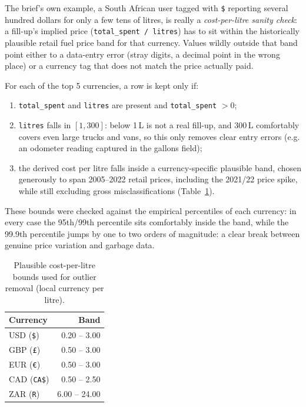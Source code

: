 \documentclass{article}
\begin{document}
The brief's own example, a South African user tagged with \texttt{\$} reporting
several hundred dollars for only a few tens of litres, is really a \emph{cost-per-litre
sanity check}: a fill-up's implied price (\texttt{total\_spent / litres}) has to sit
within the historically plausible retail fuel price band for that currency. Values
wildly outside that band point either to a data-entry error (stray digits, a decimal
point in the wrong place) or a currency tag that does not match the price actually paid.

For each of the top 5 currencies, a row is kept only if:
\begin{enumerate}
  \item \texttt{total\_spent} and \texttt{litres} are present and \texttt{total\_spent} $> 0$;
  \item \texttt{litres} falls in $[1, 300]$: below 1\,L is not a real fill-up, and
    300\,L comfortably covers even large trucks and vans, so this only removes clear
    entry errors (e.g. an odometer reading captured in the gallons field);
  \item the derived cost per litre falls inside a currency-specific plausible band,
    chosen generously to span 2005--2022 retail prices, including the 2021/22 price
    spike, while still excluding gross misclassifications (Table~\ref{tab:bounds}).
\end{enumerate}

These bounds were checked against the empirical percentiles of each currency: in every
case the 95th/99th percentile sits comfortably inside the band, while the 99.9th
percentile jumps by one to two orders of magnitude: a clear break between genuine
price variation and garbage data.

\begin{table}[h]
  \caption{Plausible cost-per-litre bounds used for outlier removal (local currency per litre).}
  \label{tab:bounds}
  \centering
  \begin{tabular}{lr}
    \toprule
    Currency & Band \\
    \midrule
    USD (\texttt{\$}) & 0.20 -- 3.00 \\
    GBP (\texttt{£}) & 0.50 -- 3.00 \\
    EUR (\texttt{€}) & 0.50 -- 3.00 \\
    CAD (\texttt{CA\$}) & 0.50 -- 2.50 \\
    ZAR (\texttt{R}) & 6.00 -- 24.00 \\
    \bottomrule
  \end{tabular}
\end{table}
\end{document}

